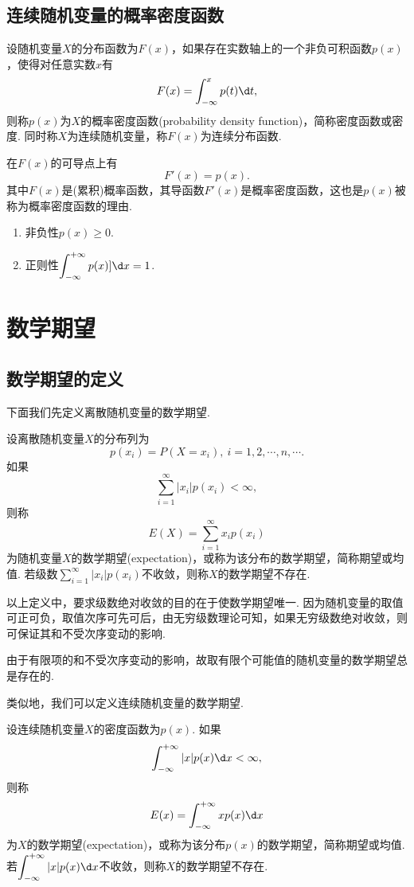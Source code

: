 \documentclass[lang=cn,10pt]{elegantbook}
\begin{document}
\subsection{连续随机变量的概率密度函数}
\begin{definition}
	设随机变量$X$的分布函数为$F(x)$，如果存在实数轴上的一个非负可积函数$p(x)$，使得对任意实数$x$有
	$$F(x)=\int_{-\infty}^{x}p(t)\d t,$$
	则称$p(x)$为$X$的{\heiti 概率密度函数}(probability density function)，简称{\heiti 密度函数}或{\heiti 密度}. 同时称$X$为{\heiti 连续随机变量}，称$F(x)$为{\heiti 连续分布函数}.
\end{definition}
在$F(x)$的可导点上有
$$F'(x)=p(x).$$
其中$F(x)$是(累积)概率函数，其导函数$F'(x)$是概率密度函数，这也是$p(x)$被称为概率密度函数的理由.
\begin{theorem}[密度函数基本性质]
	\begin{enumerate}[(1)]
		\item {\heiti 非负性}\quad $p(x)\geqslant 0$.
		\item {\heiti 正则性}\quad $\displaystyle\int_{-\infty}^{+\infty}p(x)]\d x=1$.
	\end{enumerate}
\end{theorem}
\section{数学期望}
\subsection{数学期望的定义}
下面我们先定义离散随机变量的数学期望.
\begin{definition}[离散随机变量的数学期望]
	设离散随机变量$X$的分布列为
	$$p(x_i)=P(X=x_i),\ i=1,2,\cdots,n,\cdots.$$
	如果
	$$\sum_{i=1}^{\infty}|x_i|p(x_i)<\infty,$$
	则称
	$$E(X)=\sum_{i=1}^{\infty}x_ip(x_i)$$
	为随机变量$X$的{\heiti 数学期望}(expectation)，或称为该分布的数学期望，简称{\heiti 期望}或{\heiti 均值}. 若级数$\displaystyle\sum_{i=1}^{\infty}|x_i|p(x_i)$不收敛，则称$X$的数学期望不存在.
\end{definition}
\begin{remark}
	以上定义中，要求级数绝对收敛的目的在于使数学期望唯一. 因为随机变量的取值可正可负，取值次序可先可后，由无穷级数理论可知，如果无穷级数绝对收敛，则可保证其和不受次序变动的影响. 
\end{remark}
\begin{remark}
	由于有限项的和不受次序变动的影响，故取有限个可能值的随机变量的数学期望总是存在的.
\end{remark}
类似地，我们可以定义连续随机变量的数学期望.
\begin{definition}[连续随机变量的数学期望]
	设连续随机变量$X$的密度函数为$p(x)$. 如果
	$$\int_{-\infty}^{+\infty}|x|p(x)\d x<\infty,$$
	则称
	$$E(x)=\int_{-\infty}^{+\infty}xp(x)\d x$$
	为$X$的{\heiti 数学期望}(expectation)，或称为该分布$p(x)$的数学期望，简称{\heiti 期望}或{\heiti 均值}. 若$\displaystyle\int_{-\infty}^{+\infty}|x|p(x)\d x$不收敛，则称$X$的数学期望不存在.
\end{definition}
\end{document}
